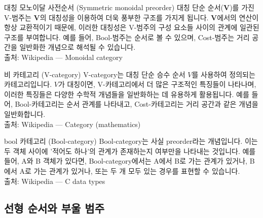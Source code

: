 \documentclass[11pt, a4paper, twoside, openany]{book}
\begin{document}
{\begin{deepresearch}{대칭 모노이달 사전순서 (Symmetric monoidal preorder)}
대칭 단순 순서($\mathbf{V}$)를 가진 V-범주는 $\mathbf{V}$의 대칭성을 이용하여 더욱 풍부한 구조를 가지게 됩니다.  $\mathbf{V}$에서의 연산이 항상 교환적이기 때문에, 이러한 대칭성은 V-범주의 구성 요소들 사이의 관계에 일관된 구조를 부여합니다. 예를 들어, Bool-범주는 순서로 볼 수 있으며, Cost-범주는 거리 공간을 일반화한 개념으로 해석될 수 있습니다.
\\[4pt]{\footnotesize\color{ctgray} 출처: Wikipedia — Monoidal category}
\end{deepresearch}

\begin{deepresearch}{비 카테고리 (V-category)}
V-category\hspace{0pt}는 대칭 단순 승수 순서 $V$를 사용하여 정의되는 카테고리입니다.  $V$가 대칭이면, V-카테고리에서 더 많은 구조적인 특징들이 나타나며, 이러한 특징들은 다양한 수학적 개념들을 일반화하는 데 유용하게 활용됩니다. 예를 들어, Bool-카테고리는 순서 관계를 나타내고, Cost-카테고리는 거리 공간과 같은 개념을 일반화합니다.
\\[4pt]{\footnotesize\color{ctgray} 출처: Wikipedia — Category (mathematics)}
\end{deepresearch}

\begin{deepresearch}{bool 카테고리 (Bool-category)}
Bool-category\hspace{0pt}는 사실 preorder\hspace{0pt}라는 개념입니다.  이는 두 객체 사이에 '적어도 하나'의 관계가 존재하는지 여부만을 나타내는 것입니다. 예를 들어, A\hspace{0pt}와 B 객체가 있다면, Bool-category\hspace{0pt}에서는 A\hspace{0pt}에서 B\hspace{0pt}로 가는 관계가 있거나, B\hspace{0pt}에서 A\hspace{0pt}로 가는 관계가 있거나, 또는 두 개 모두 있는 경우를 표현할 수 있습니다.
\\[4pt]{\footnotesize\color{ctgray} 출처: Wikipedia — C data types}
\end{deepresearch}


\subsection{선형 순서와 부울 범주}
\label{sec:2-3-2}

}
\end{document}
